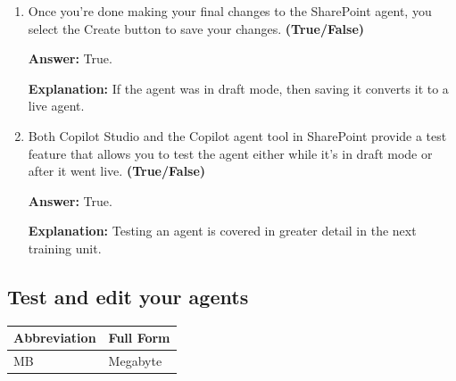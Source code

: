 \documentclass[10pt]{article}
\begin{document}
\begin{enumerate}[leftmargin=*]
\item Once you're done making your final changes to the SharePoint agent, you select the Create button to save your changes. \textbf{(True/False)}

\textbf{Answer:} True.

\textbf{Explanation:} If the agent was in draft mode, then saving it converts it to a live agent.

\item Both Copilot Studio and the Copilot agent tool in SharePoint provide a test feature that allows you to test the agent either while it's in draft mode or after it went live. \textbf{(True/False)}

\textbf{Answer:} True.

\textbf{Explanation:} Testing an agent is covered in greater detail in the next training unit.

\end{enumerate}

\clearpage

\subsection{Test and edit your agents}

\begin{center}
\begin{tabular}{>{\raggedright\arraybackslash}p{} >{\raggedright\arraybackslash}p{}}
\toprule
\textbf{Abbreviation} & \textbf{Full Form} \\
\midrule
MB & Megabyte \\
\bottomrule
\end{tabular}
\end{center}
\end{document}
